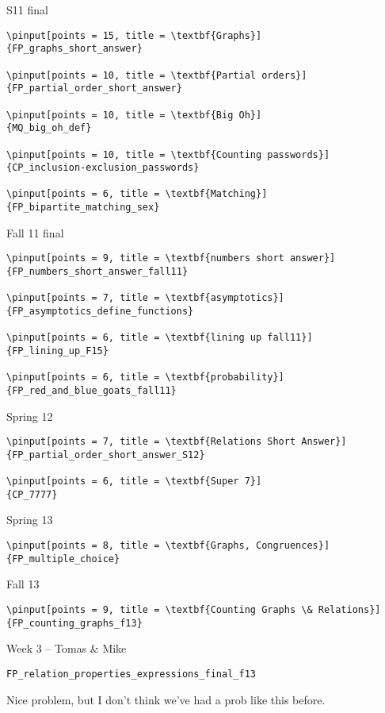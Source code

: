 \documentclass[quiz]{mcs}
\begin{document}
\begin{staffnotes}
\begin{verbatim}
\end{verbatim}

S11 final

\begin{verbatim}
\pinput[points = 15, title = \textbf{Graphs}]
{FP_graphs_short_answer}

\pinput[points = 10, title = \textbf{Partial orders}]
{FP_partial_order_short_answer}

\pinput[points = 10, title = \textbf{Big Oh}]
{MQ_big_oh_def}

\pinput[points = 10, title = \textbf{Counting passwords}]
{CP_inclusion-exclusion_passwords}

\pinput[points = 6, title = \textbf{Matching}]
{FP_bipartite_matching_sex}
\end{verbatim}

Fall 11 final

\begin{verbatim}
\pinput[points = 9, title = \textbf{numbers short answer}]
{FP_numbers_short_answer_fall11}

\pinput[points = 7, title = \textbf{asymptotics}]
{FP_asymptotics_define_functions}

\pinput[points = 6, title = \textbf{lining up fall11}]
{FP_lining_up_F15}

\pinput[points = 6, title = \textbf{probability}]
{FP_red_and_blue_goats_fall11}
\end{verbatim}

Spring 12

\begin{verbatim}
\pinput[points = 7, title = \textbf{Relations Short Answer}]
{FP_partial_order_short_answer_S12}

\pinput[points = 6, title = \textbf{Super 7}]
{CP_7777}
\end{verbatim}

Spring 13

\begin{verbatim}
\pinput[points = 8, title = \textbf{Graphs, Congruences}]
{FP_multiple_choice}
\end{verbatim}

Fall 13

\begin{verbatim}
\pinput[points = 9, title = \textbf{Counting Graphs \& Relations}]
{FP_counting_graphs_f13}
\end{verbatim}

\begin{center}
{\large Week 3 -- Tomas \& Mike}
\end{center}
\begin{verbatim}
FP_relation_properties_expressions_final_f13
\end{verbatim}
Nice problem, but I don't think we've had a prob like this before.


\end{staffnotes}
\end{document}
